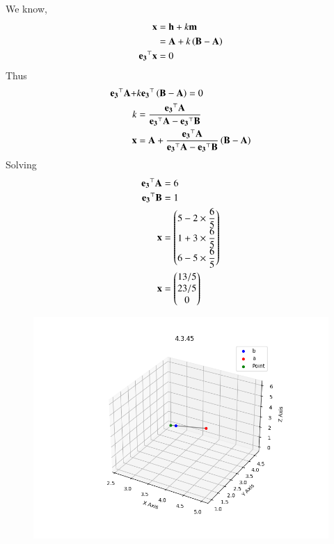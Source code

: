 \documentclass[journal,12pt,onecolumn]{IEEEtran}
\theoremstyle{remark}
\begin{document}
We know,
\begin{align}
 \mathbf{x} &= \mathbf{h} +k\mathbf{m} \\
 &= \mathbf{A} + k\left(\mathbf{B-A}\right) \\
 \mathbf{e_3}^\top\mathbf{x} &= 0
\end{align}
Thus
\begin{align}
 \mathbf{e_3}^\top\mathbf{A} + &k\mathbf{e_3}^\top\left(\mathbf{B-A}\right) = 0 \\
 k &= \frac{\mathbf{e_3}^\top\mathbf{A}}{\mathbf{e_3}^\top\mathbf{A}-\mathbf{e_3}^\top\mathbf{B}} \\
 \mathbf{x} &= \mathbf{A} + \frac{\mathbf{e_3}^\top\mathbf{A}}{\mathbf{e_3}^\top\mathbf{A}-\mathbf{e_3}^\top\mathbf{B}}\left(\mathbf{B-A}\right)
\end{align}
Solving
\begin{align}
\mathbf{e_3}^\top\mathbf{A} &= 6 \\
\mathbf{e_3}^\top\mathbf{B} &= 1 \\
 \mathbf{x} &= \begin{pmatrix}5-2\times\dfrac{6}{5} \\ 1+3\times\dfrac{6}{5} \\ 6-5\times\dfrac{6}{5}\end{pmatrix} \\
  \mathbf{x} &= \begin{pmatrix}13/5 \\ 23/5 \\ 0\end{pmatrix}
\end{align}
\begin{figure}[H]
    \centering
    \includegraphics{figs/plot.png}
    \caption*{}
    \label{fig:plot}
\end{figure}
\end{document}

